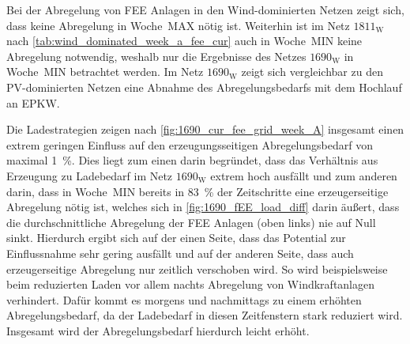 

Bei der Abregelung von \gls{FEE} Anlagen in den Wind-dominierten Netzen zeigt sich, dass keine Abregelung in Woche~MAX nötig ist.
Weiterhin ist im Netz \(1811_{\text{W}}\) nach \autoref{tab:wind_dominated_week_a_fee_cur} auch in Woche~MIN keine Abregelung notwendig, weshalb nur die Ergebnisse des Netzes \(1690_{\text{W}}\) in Woche~MIN betrachtet werden.
Im Netz \(1690_{\text{W}}\) zeigt sich vergleichbar zu den \gls{PV}-dominierten Netzen eine Abnahme des Abregelungsbedarfs mit dem Hochlauf an \gls{EPKW}.\medskip

Die Ladestrategien zeigen nach \autoref{fig:1690_cur_fee_grid_week_A} insgesamt einen extrem geringen Einfluss auf den erzeugungsseitigen Abregelungsbedarf von maximal \SI{1}{\percent}.
Dies liegt zum einen darin begründet, dass das Verhältnis aus Erzeugung zu Ladebedarf im Netz \(1690_{\text{W}}\) extrem hoch ausfällt und zum anderen darin, dass in Woche~MIN bereits in \SI{83}{\percent} der Zeitschritte eine erzeugerseitige Abregelung nötig ist, welches sich in \autoref{fig:1690_fEE_load_diff} darin äußert, dass die durchschnittliche Abregelung der \gls{FEE} Anlagen (oben links) nie auf Null sinkt.
Hierdurch ergibt sich auf der einen Seite, dass das Potential zur Einflussnahme sehr gering ausfällt und auf der anderen Seite, dass auch erzeugerseitige Abregelung nur zeitlich verschoben wird.
So wird beispielsweise beim reduzierten Laden vor allem nachts Abregelung von Windkraftanlagen verhindert.
Dafür kommt es morgens und nachmittags zu einem erhöhten Abregelungsbedarf, da der Ladebedarf in diesen Zeitfenstern stark reduziert wird.
Insgesamt wird der Abregelungsbedarf hierdurch leicht erhöht.




